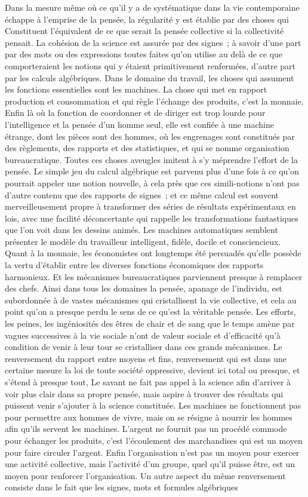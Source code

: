 \documentclass[french,twoside]{book} %
\begin{document}
Dans la mesure même où ce qu'il y a de systématique dans la vie contemporaine échappe à l'emprise de la pensée, la régularité y est établie par des choses qui Constituent l'équivalent de ce que serait la pensée collective si la collectivité pensait. La cohésion de la science est assurée par des signes ; à savoir d'une part par des mots ou des expressions toutes faites qu'on utilise au delà de ce que comporteraient les notions qui y étaient primitivement renfermées, d'autre part par les calculs algébriques. Dans le domaine du travail, les choses qui assument les fonctions essentielles sont les machines. La chose qui met en rapport production et consommation et qui règle l'échange des produits, c'est la monnaie. Enfin là où la fonction de coordonner et de diriger est trop lourde pour l'intelligence et la pensée d’un homme seul, elle est confiée à une machine étrange, dont les pièces sont des hommes, où les engrenages sont constitués par des règlements, des rapports et des statistiques, et qui se nomme organisation bureaucratique. Toutes ces choses aveugles imitent à s'y méprendre l'effort de la pensée. Le simple jeu du calcul algébrique est parvenu plus d'une fois à ce qu'on pourrait appeler une notion nouvelle, à cela près que ces simili-notions n'ont pas d'autre contenu que des rapports de signes ; et ce même calcul est souvent merveilleusement propre à transformer des séries de résultats expérimentaux en lois, avec une facilité déconcertante qui rappelle les transformations fantastiques que l'on voit dans les dessins animés. Les machines automatiques semblent présenter le modèle du travailleur intelligent, fidèle, docile et consciencieux. Quant à la monnaie, les économistes ont longtemps été persuadés qu'elle possède la vertu d'établir entre les diverses fonctions économiques des rapports harmonieux. Et les mécanismes bureaucratiques parviennent presque à remplacer des chefs. Ainsi dans tous les domaines la pensée, apanage de l'individu, est subordonnée à de vastes mécanismes qui cristallisent la vie collective, et cela au point qu'on a presque perdu le sens de ce qu'est la véritable pensée. Les efforts, les peines, les ingéniosités des êtres de chair et de sang que le temps amène par vagues successives à la vie sociale n'ont de valeur sociale et d'efficacité qu'à condition de venir à leur tour se cristalliser dans ces grands mécanismes. Le renversement du rapport entre moyens et fins, renversement qui est dans une certaine mesure la loi de toute société oppressive, devient ici total ou presque, et s'étend à presque tout, Le savant ne fait pas appel à la science afin d'arriver à voir plus clair dans sa propre pensée, mais aspire à trouver des résultats qui puissent venir s'ajouter à la science constituée. Les machines ne fonctionnent pas pour permettre aux hommes de vivre, mais on se résigne à nourrir les hommes afin qu'ils servent les machines. L'argent ne fournit pas un procédé commode pour échanger les produits, c'est l'écoulement des marchandises qui est un moyen pour faire circuler l'argent. Enfin l'organisation n'est pas un moyen pour exercer une activité collective, mais l'activité d'un groupe, quel qu'il puisse être, est un moyen pour renforcer l'organisation. Un autre aspect du même renversement consiste dans le fait que les signes, mots et formules algébriques 
\end{document}
